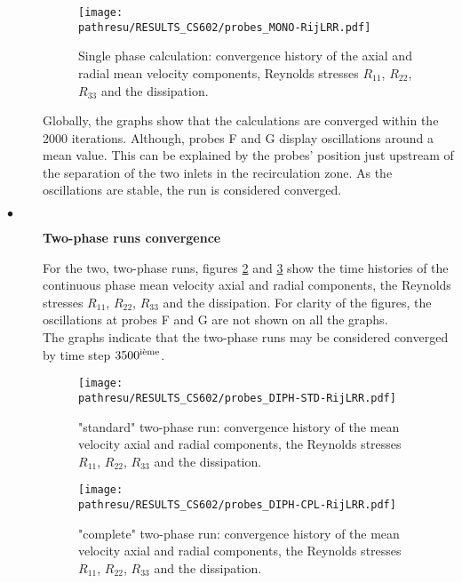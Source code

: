 \documentclass[a4paper,twoside,12pt]{article}
\newcommand{\pathresu}{./FIGURES}
\begin{document}
\begin{description}
         \begin{figure}[h]
            \centerline{\texttt{[image: \\pathresu/RESULTS\_CS602/probes\_MONO-RijLRR.pdf]}}
            \caption{Single phase calculation: convergence history of the axial and radial mean velocity components, Reynolds stresses $R_{11}$, $R_{22}$, $R_{33}$ and the dissipation.}
            \label{Histo_mono}
         \end{figure}

         Globally, the graphs show that the calculations are converged within the 2000 iterations. Although, probes F and G display oscillations around a mean value. This can be explained by the probes' position just upstream of the separation of the two inlets in the recirculation zone. As the oscillations are stable, the run is considered converged.

   \item[$\bullet$]\textbf{Two-phase runs convergence}

         For the two, two-phase runs, figures \ref{Histo_Std} and
         \ref{Histo_Cplt} show the time histories of the continuous phase mean velocity axial and radial components, the Reynolds stresses $R_{11}$, $R_{22}$, $R_{33}$ and the
         dissipation. For clarity of the figures, the oscillations at probes F and G are not shown on all the graphs. \\ The graphs indicate that the two-phase runs may be considered converged by time step $3500^{\mbox{\scriptsize{ième}}}$.


         \begin{figure}[h]
            \centerline{\texttt{[image: \\pathresu/RESULTS\_CS602/probes\_DIPH-STD-RijLRR.pdf]}}
            \caption{"standard" two-phase run: convergence history of the mean velocity axial and radial components, the Reynolds stresses $R_{11}$, $R_{22}$, $R_{33}$ and the dissipation.}
            \label{Histo_Std}
         \end{figure}

         \begin{figure}[h]
            \centerline{\texttt{[image: \\pathresu/RESULTS\_CS602/probes\_DIPH-CPL-RijLRR.pdf]}}
            \caption{"complete" two-phase run: convergence history of the mean velocity axial and radial components, the Reynolds stresses $R_{11}$, $R_{22}$, $R_{33}$ and the dissipation.}
            \label{Histo_Cplt}
         \end{figure}



\end{description}
\end{document}
